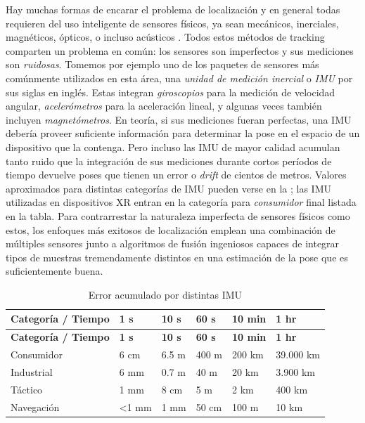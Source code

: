 \documentclass[ twoside,openright,titlepage,numbers=noenddot,%
                headinclude,footinclude,cleardoublepage=empty,abstract=on,
                BCOR=-5mm,paper=a4,fontsize=11pt
                ]{scrreprt}
\begin{document}
Hay muchas formas de encarar el problema de localización y en general
todas requieren del uso inteligente de sensores físicos, ya sean
mecánicos, inerciales, magnéticos, ópticos, o incluso acústicos
\autocite{welchMotionTrackingNo2002}. Todos estos métodos de tracking
comparten un problema en común: los sensores son imperfectos y sus
mediciones son \emph{ruidosas}. Tomemos por ejemplo uno de los paquetes
de sensores más comúnmente utilizados en esta área, una \emph{unidad de
medición inercial} o \emph{IMU} por sus siglas en inglés. Estas integran
\emph{giroscopios} para la medición de velocidad angular,
\emph{acelerómetros} para la aceleración lineal, y algunas veces también
incluyen \emph{magnetómetros}. En teoría, si sus mediciones fueran
perfectas, una IMU debería proveer suficiente información para
determinar la pose en el espacio de un dispositivo que la contenga. Pero
incluso las IMU de mayor calidad acumulan tanto ruido que la integración
de sus mediciones durante cortos períodos de tiempo devuelve poses que
tienen un error o \emph{drift} de cientos de metros. Valores aproximados
para distintas categorías de IMU pueden verse en la
 \autocite[secc
3.3]{vectornavInertialNavigationPrimer}; las IMU utilizadas en
dispositivos XR entran en la categoría para \emph{consumidor} final
listada en la tabla. Para contrarrestar la naturaleza imperfecta de
sensores físicos como estos, los enfoques más exitosos de localización
emplean una combinación de múltiples sensores junto a algoritmos de
fusión ingeniosos capaces de integrar tipos de muestras tremendamente
distintos en una estimación de la pose que es suficientemente buena.

\begin{longtable}[]{@{}llllll@{}}
\caption{\label{tbl:imu-accumulated-error} Error acumulado por distintas
IMU}\tabularnewline
\toprule
\textbf{Categoría / Tiempo} & \textbf{1 s} & \textbf{10 s} & \textbf{60
s} & \textbf{10 min} & \textbf{1 hr} \\
\midrule
\endfirsthead
\toprule
\textbf{Categoría / Tiempo} & \textbf{1 s} & \textbf{10 s} & \textbf{60
s} & \textbf{10 min} & \textbf{1 hr} \\
\midrule
\endhead
Consumidor & 6 cm & 6.5 m & 400 m & 200 km & 39.000 km \\
Industrial & 6 mm & 0.7 m & 40 m & 20 km & 3.900 km \\
Táctico & 1 mm & 8 cm & 5 m & 2 km & 400 km \\
Navegación & \textless1 mm & 1 mm & 50 cm & 100 m & 10 km \\
\bottomrule
\end{longtable}
\end{document}
